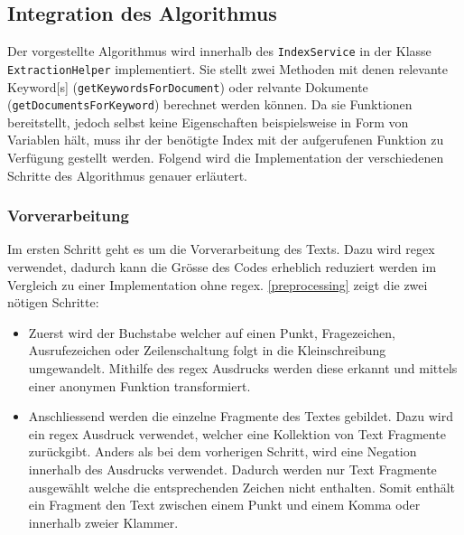 \subsection{Integration des Algorithmus}\label{impalgo}
Der vorgestellte Algorithmus wird innerhalb des \texttt{IndexService} in der Klasse \texttt{ExtractionHelper} implementiert. Sie stellt zwei Methoden mit denen relevante \gls{Keyword}[s] (\texttt{getKeywordsForDocument}) oder relvante Dokumente (\texttt{getDocumentsForKeyword}) berechnet werden können. Da sie Funktionen bereitstellt, jedoch selbst keine Eigenschaften beispielsweise in Form von Variablen hält, muss ihr der benötigte Index mit der aufgerufenen Funktion zu Verfügung gestellt werden. 
Folgend wird die Implementation der verschiedenen Schritte des Algorithmus genauer erläutert.

\subsubsection{Vorverarbeitung}
Im ersten Schritt geht es um die Vorverarbeitung des Texts. Dazu wird \gls{regex} verwendet, dadurch kann die Grösse des Codes erheblich reduziert werden im Vergleich zu einer Implementation ohne \gls{regex}. \autoref{preprocessing} zeigt die zwei nötigen Schritte:
\begin{itemize}
    \item Zuerst wird der Buchstabe welcher auf einen Punkt, Fragezeichen, Ausrufezeichen oder Zeilenschaltung folgt in die Kleinschreibung umgewandelt. Mithilfe des \gls{regex} Ausdrucks werden diese erkannt und mittels einer anonymen Funktion transformiert.
    \item Anschliessend werden die einzelne Fragmente des Textes gebildet. Dazu wird ein \gls{regex} Ausdruck verwendet, welcher eine Kollektion von Text Fragmente zurückgibt. Anders als bei dem vorherigen Schritt, wird eine Negation innerhalb des Ausdrucks verwendet. Dadurch werden nur Text Fragmente ausgewählt welche die entsprechenden Zeichen nicht enthalten. Somit enthält ein Fragment den Text zwischen einem Punkt und einem Komma oder innerhalb zweier Klammer. 
\end{itemize}



